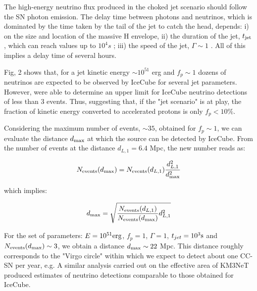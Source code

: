 \documentclass[twocolumn]{aastex631}
\begin{document}
{The high-energy neutrino flux produced in the choked jet scenario should follow the SN photon emission. The delay time between photons and neutrinos, which is dominated by the time taken by the tail of the jet to catch the head, depends: i) on the size and location of the massive H envelope, ii) the duration of the jet, $t_{\rm jet}$, which can reach values up to $10^{4}s$  \citep{Stratta2015}; iii) the speed of the jet, $\Gamma \sim 1$ \citep{Izzo2019}. All of this implies a delay time of several hours. 




Fig, 2 shows that, for a jet kinetic energy $\sim 10^{51}$ erg and $f_p\sim1$ dozens of neutrinos are expected to be observed by IceCube for several jet parameters. However, \citep{IceCubeSN2023} were able to determine an upper limit for IceCube neutrino detections of less than 3 events. Thus, suggesting that, if the "jet scenario" is at play, the fraction of kinetic energy converted to accelerated protons is only $f_p<10\%$.



Considering the maximum number of events, $\sim 35$, obtained for $f_p\sim 1$, we can evaluate the distance $d_{\rm max}$ at which the source can be detected by IceCube. From the number of events at the distance $d_{L,1}= 6.4 $ Mpc, the new number reads as:

\begin{equation}
    N_{\rm events}(d_{\rm max})=   N_{\rm events}(d_{L,1}) \frac{d_{L,1}^2}{d_{\rm max}^2} 
\end{equation}

which implies:

\begin{equation}
    d_{\rm max}= \sqrt{\frac{N_{\rm events}(d_{L,1})}{{ N_{\rm events}(d_{\rm max})} } d_{L,1}^2 }
\end{equation}

For the set of parameters: $E=10^{51} \rm erg$, $f_p=1$, $\Gamma=1$, $t_{jet}=10^3 \rm s$ and $N_{\rm events}(d_{\rm max})\sim3$, we obtain a distance $d_{\rm max}\sim 22 $ Mpc. This distance roughly corresponds to the "Virgo circle" within which we expect to detect about one CC-SN per year, e.g. \citep{Cappellaro2015, Botticella2017,burderi2020} 
A similar analysis carried out on the effective area of KM3NeT produced estimates of neutrino detections comparable to those obtained for IceCube.
\smallskip

}
\end{document}
